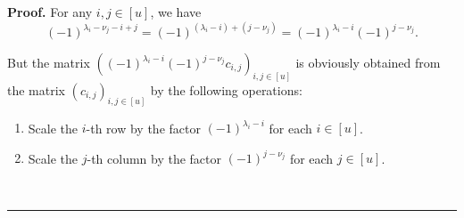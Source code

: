 \documentclass[numbers=enddot,12pt,final,onecolumn,notitlepage]{scrartcl}%
\numberwithin{exer}{section}
\theoremstyle{definition}
\newenvironment{proof}[1][Proof]{\noindent\textbf{#1.} }{\ \rule{0.5em}{0.5em}}
\theoremstyle{plainsl}
\begin{document}
\begin{proof}
For any $i,j\in\left[  u\right]  $, we have
\begin{equation}
\left(  -1\right)  ^{\lambda_{i}-\nu_{j}-i+j}=\left(  -1\right)  ^{\left(
\lambda_{i}-i\right)  +\left(  j-\nu_{j}\right)  }=\left(  -1\right)
^{\lambda_{i}-i}\left(  -1\right)  ^{j-\nu_{j}}. \label{pf.lem.detscalesign.1}%
\end{equation}


But the matrix $\left(  \left(  -1\right)  ^{\lambda_{i}-i}\left(  -1\right)
^{j-\nu_{j}}c_{i,j}\right)  _{i,j\in\left[  u\right]  }$ is obviously obtained
from the matrix $\left(  c_{i,j}\right)  _{i,j\in\left[  u\right]  }$ by the
following operations:

\begin{enumerate}
\item Scale the $i$-th row by the factor $\left(  -1\right)  ^{\lambda_{i}-i}$
for each $i\in\left[  u\right]  $.

\item Scale the $j$-th column by the factor $\left(  -1\right)  ^{j-\nu_{j}}$
for each $j\in\left[  u\right]  $.
\end{enumerate}


\end{proof}
\end{document}
